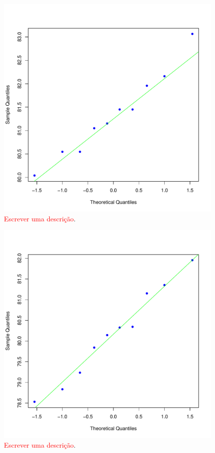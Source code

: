 \documentclass[conference]{IEEEtran}
\begin{document}
\begin{figure}[h]
	\centering
	\includegraphics[width=\linewidth]{img/bluenorm_cmfdr.pdf}
	\caption{\textcolor{red}{Escrever uma descrição}.}
	\label{fig:hist_cmfdr}
\end{figure}

\begin{figure}[h]
	\centering
	\includegraphics[width=\linewidth]{img/bluenorm_afsa_mfdr.pdf}
	\caption{\textcolor{red}{Escrever uma descrição}.}
	\label{fig:hist_afsa_mfdr}
\end{figure}
\end{document}
